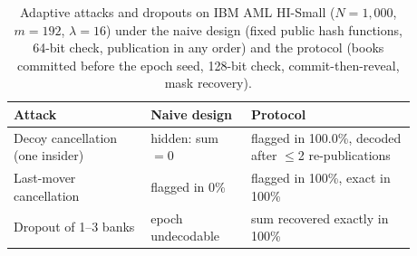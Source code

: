\begin{table}[!htbp]\centering\small
\caption{Adaptive attacks and dropouts on IBM AML HI-Small ($N=1{,}000$, $m=192$, $\lambda=16$) under the naive design (fixed public hash functions, 64-bit check, publication in any order) and the protocol (books committed before the epoch seed, 128-bit check, commit-then-reveal, mask recovery).}\label{tab:attacks}
\begin{adjustbox}{max width=\linewidth}\begin{tabular}{L{0.30\linewidth}L{0.22\linewidth}L{0.36\linewidth}}\toprule
Attack & Naive design & Protocol \\\midrule
Decoy cancellation (one insider) & hidden: sum $=0$ & flagged in 100.0\%, decoded after $\le$2 re-publications \\
Last-mover cancellation & flagged in 0\% & flagged in 100\%, exact in 100\% \\
Dropout of 1--3 banks & epoch undecodable & sum recovered exactly in 100\% \\
\bottomrule\end{tabular}\end{adjustbox}\end{table}